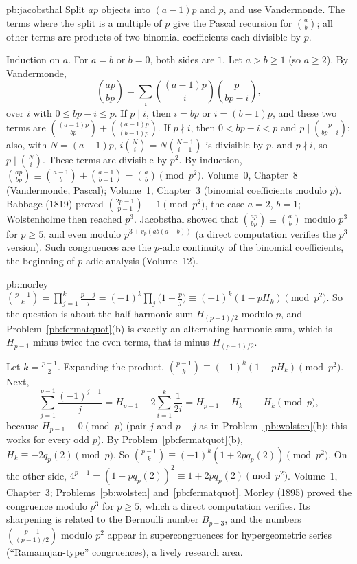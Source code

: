 \begin{solution}{pb:jacobsthal}
\idea Split $ap$ objects into $(a-1)p$ and $p$, and use Vandermonde. The terms where the split is a multiple of $p$ give the
Pascal recursion for $\binom ab$; all other terms are products of two binomial coefficients each divisible by $p$.

\writeup Induction on $a$. For $a=b$ or $b=0$, both sides are $1$. Let $a>b\ge1$ (so $a\ge2$). By Vandermonde,
\[
\binom{ap}{bp}=\sum_i\binom{(a-1)p}i\binom p{bp-i},
\]
over $i$ with $0\le bp-i\le p$. If $p\mid i$, then $i=bp$ or $i=(b-1)p$, and these two terms are $\binom{(a-1)p}{bp}+\binom{(a-1)p}{(b-1)p}$. If
$p\nmid i$, then $0<bp-i<p$ and $p\mid\binom p{bp-i}$; also, with $N=(a-1)p$, $i\binom Ni=N\binom{N-1}{i-1}$ is divisible by $p$, and $p\nmid i$,
so $p\mid\binom Ni$. These terms are divisible by $p^2$. By induction,
$\binom{ap}{bp}\equiv\binom{a-1}b+\binom{a-1}{b-1}=\binom ab\pmod{p^2}$.
\tools Volume~0, Chapter~8 (Vandermonde, Pascal); Volume~1, Chapter~3 (binomial coefficients modulo $p$).
\leads Babbage (1819) proved $\binom{2p-1}{p-1}\equiv1\pmod{p^2}$, the case $a=2$, $b=1$; Wolstenholme then reached $p^3$. Jacobsthal showed that
$\binom{ap}{bp}\equiv\binom ab$ modulo $p^3$ for $p\ge5$, and even modulo $p^{3+v_p(ab(a-b))}$ (a direct computation verifies the $p^3$ version). Such
congruences are the $p$-adic continuity of the binomial coefficients, the beginning of $p$-adic analysis (Volume~12).
\end{solution}

\begin{solution}{pb:morley}
\idea $\binom{p-1}k=\prod_{j=1}^k\frac{p-j}j=(-1)^k\prod_j\bigl(1-\frac pj\bigr)\equiv(-1)^k(1-pH_k)\pmod{p^2}$. So the question is about the half
harmonic sum $H_{(p-1)/2}$ modulo $p$, and Problem~\ref{pb:fermatquot}(b) is exactly an alternating harmonic sum, which is
$H_{p-1}$ minus twice the even terms, that is minus $H_{(p-1)/2}$.

\writeup Let $k=\frac{p-1}2$. Expanding the product, $\binom{p-1}k\equiv(-1)^k(1-pH_k)\pmod{p^2}$. Next,
\[
\sum_{j=1}^{p-1}\frac{(-1)^{j-1}}j=H_{p-1}-2\sum_{i=1}^{k}\frac1{2i}=H_{p-1}-H_k\equiv-H_k\pmod p,
\]
because $H_{p-1}\equiv0\pmod p$ (pair $j$ and $p-j$ as in Problem~\ref{pb:wolsten}(b); this works for every odd $p$). By
Problem~\ref{pb:fermatquot}(b), $H_k\equiv-2q_p(2)\pmod p$. So $\binom{p-1}k\equiv(-1)^k(1+2pq_p(2))\pmod{p^2}$. On the other side,
$4^{p-1}=(1+pq_p(2))^2\equiv1+2pq_p(2)\pmod{p^2}$.
\tools Volume~1, Chapter~3; Problems~\ref{pb:wolsten} and~\ref{pb:fermatquot}.
\leads Morley (1895) proved the congruence modulo $p^3$ for $p\ge5$, which a direct computation verifies. Its sharpening is related to the
Bernoulli number $B_{p-3}$, and the numbers $\binom{p-1}{(p-1)/2}$ modulo $p^2$ appear in supercongruences for hypergeometric series
(``Ramanujan-type'' congruences), a lively research area.
\end{solution}

